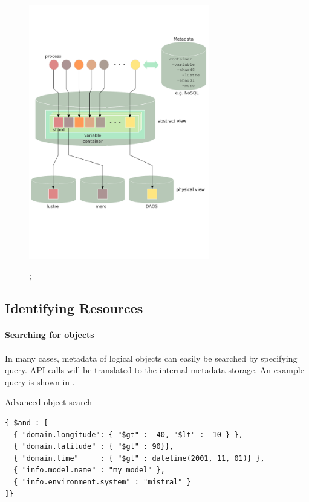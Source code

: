 \documentclass{../../template/esiwace-report}
\begin{document}
\begin{figure}[!htb]
        \centering
        \includegraphics[width=0.7\textwidth]{figures/data-model}
        \caption{}
        \label{fig:data-model};
\end{figure}



\subsection{Identifying Resources}
\paragraph{Searching for objects}

In many cases, metadata of logical objects can easily be searched by specifying  query.
API calls will be translated to the internal metadata storage.
An example query is shown in .

\begin{tcbcode}[label={lst:extendedSearch}]{Advanced object search}
\begin{lstlisting}
{ $and : [ 
  { "domain.longitude": { "$gt" : -40, "$lt" : -10 } },
  { "domain.latitude" : { "$gt" : 90}},
  { "domain.time"     : { "$gt" : datetime(2001, 11, 01)} },
  { "info.model.name" : "my model" },
  { "info.environment.system" : "mistral" }
]}
\end{lstlisting}
\end{tcbcode}
\end{document}
